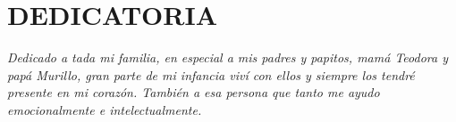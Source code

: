 
\chapter*{\hfill DEDICATORIA}
\thispagestyle{empty}

\doublespacing

\begin{flushright}
    \textit{Dedicado a tada mi familia, en especial a mis padres y papitos, mamá Teodora y papá Murillo, gran parte de mi infancia viví con ellos y siempre los tendré presente en mi corazón. También a esa persona que tanto me ayudo emocionalmente e intelectualmente.}
\end{flushright}

\restoregeometry
